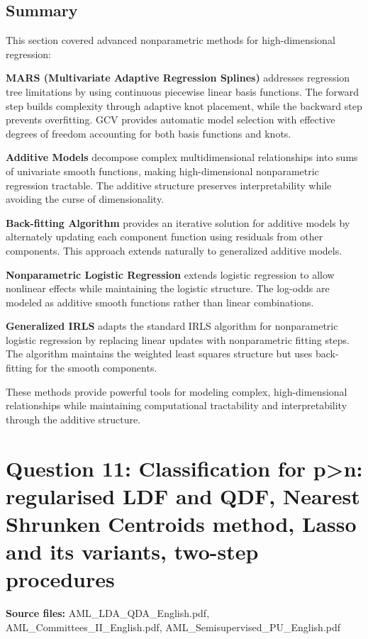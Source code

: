 \documentclass[12pt,a4paper]{article}
\begin{document}
\subsection{Summary}

This section covered advanced nonparametric methods for high-dimensional regression:

\textbf{MARS (Multivariate Adaptive Regression Splines)} addresses regression tree limitations by using continuous piecewise linear basis functions. The forward step builds complexity through adaptive knot placement, while the backward step prevents overfitting. GCV provides automatic model selection with effective degrees of freedom accounting for both basis functions and knots.

\textbf{Additive Models} decompose complex multidimensional relationships into sums of univariate smooth functions, making high-dimensional nonparametric regression tractable. The additive structure preserves interpretability while avoiding the curse of dimensionality.

\textbf{Back-fitting Algorithm} provides an iterative solution for additive models by alternately updating each component function using residuals from other components. This approach extends naturally to generalized additive models.

\textbf{Nonparametric Logistic Regression} extends logistic regression to allow nonlinear effects while maintaining the logistic structure. The log-odds are modeled as additive smooth functions rather than linear combinations.

\textbf{Generalized IRLS} adapts the standard IRLS algorithm for nonparametric logistic regression by replacing linear updates with nonparametric fitting steps. The algorithm maintains the weighted least squares structure but uses back-fitting for the smooth components.

These methods provide powerful tools for modeling complex, high-dimensional relationships while maintaining computational tractability and interpretability through the additive structure.

\newpage

\section{Question 11: Classification for p>n: regularised LDF and QDF, Nearest Shrunken Centroids method, Lasso and its variants, two-step procedures}

\textbf{Source files:} AML\_LDA\_QDA\_English.pdf, AML\_Committees\_II\_English.pdf, AML\_Semisupervised\_PU\_English.pdf
\end{document}
